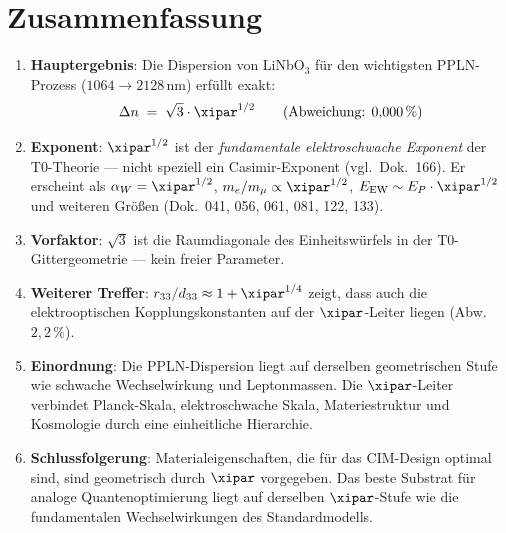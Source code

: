 \clearpage

\section{Zusammenfassung}
\label{sec:zusammenfassung}

\begin{enumerate}

    \item \textbf{Hauptergebnis}: Die Dispersion von LiNbO$_3$ für den
    wichtigsten PPLN-Prozess ($1064 \to 2128\,\text{nm}$) erfüllt exakt:
    \[
        \Delta n \;=\; \sqrt{3}\cdot\xipar^{1/2}
        \qquad (\text{Abweichung: } 0{,}000\,\%)
    \]

    \item \textbf{Exponent}: $\xipar^{1/2}$ ist der \emph{fundamentale
    elektroschwache Exponent} der T0-Theorie — nicht speziell ein
    Casimir-Exponent (vgl.\ Dok.~166). Er erscheint als
    $\alpha_W = \xipar^{1/2}$, $m_e/m_\mu \propto \xipar^{1/2}$,
    $E_\mathrm{EW} \sim E_P\cdot\xipar^{1/2}$ und weiteren Größen
    (Dok.~041, 056, 061, 081, 122, 133).

    \item \textbf{Vorfaktor}: $\sqrt{3}$ ist die Raumdiagonale des
    Einheitswürfels in der T0-Gittergeometrie — kein freier Parameter.

    \item \textbf{Weiterer Treffer}: $r_{33}/d_{33} \approx 1 + \xipar^{1/4}$
    zeigt, dass auch die elektrooptischen Kopplungskonstanten auf der
    $\xipar$-Leiter liegen (Abw.\ $2{,}2\,\%$).

    \item \textbf{Einordnung}: Die PPLN-Dispersion liegt auf derselben
    geometrischen Stufe wie schwache Wechselwirkung und Leptonmassen.
    Die $\xipar$-Leiter verbindet Planck-Skala, elektroschwache Skala,
    Materiestruktur und Kosmologie durch eine einheitliche Hierarchie.

    \item \textbf{Schlussfolgerung}: Materialeigenschaften, die für das
    CIM-Design optimal sind, sind geometrisch durch $\xipar$ vorgegeben.
    Das beste Substrat für analoge Quantenoptimierung liegt auf derselben
    $\xipar$-Stufe wie die fundamentalen Wechselwirkungen des Standardmodells.

\end{enumerate}

